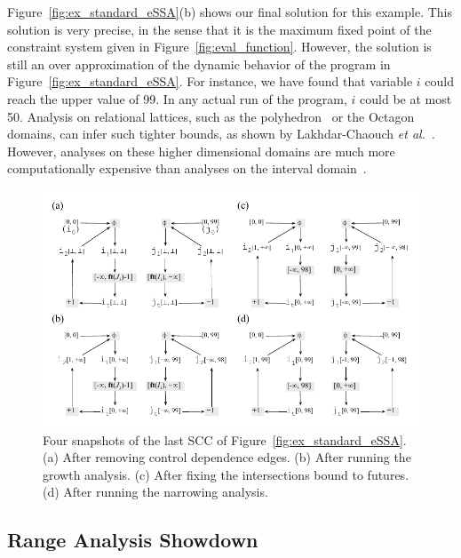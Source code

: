 \documentclass[times]{speauth}
\begin{document}
Figure~\ref{fig:ex_standard_eSSA}(b) shows our final solution for this example.
This solution is very precise, in the sense that it is the maximum fixed
point of the constraint system given in Figure~\ref{fig:eval_function}.
However, the solution is still an over approximation of the dynamic behavior of
the program in Figure~\ref{fig:ex_standard_eSSA}.
For instance, we have found that variable $i$ could reach the upper value of
99.
In any actual run of the program, $i$ could be at most 50.
Analysis on relational lattices, such as the polyhedron~\cite{Cousot78} or the
Octagon~\cite{Mine06} domains, can infer such tighter bounds, as shown by
Lakhdar-Chaouch {\em et al.}~\cite{Lakhdar11}.
However, analyses on these higher dimensional domains are much more
computationally expensive than analyses on the interval domain~\cite{Oh12}.

\begin{figure}[t!]
\begin{center}
\includegraphics[width=\textwidth]{images/ex_partition_grow_crop}
\end{center}
\caption{\label{fig:ex_partition_grow_crop}
Four snapshots of the last SCC of Figure~\ref{fig:ex_standard_eSSA}.
(a) After removing control dependence edges.
(b) After running the growth analysis.
(c) After fixing the intersections bound to futures.
(d) After running the narrowing analysis.}
\end{figure}

\subsection{Range Analysis Showdown}
\label{sub:showdown}
\end{document}
